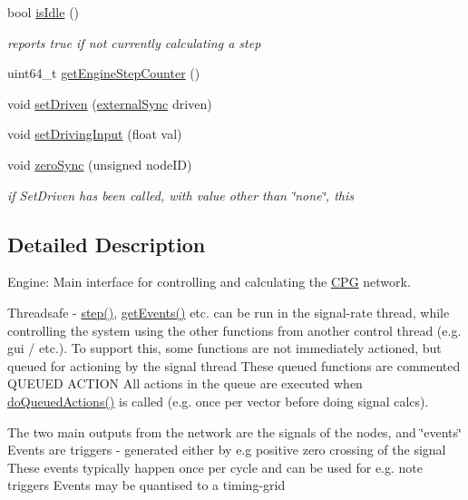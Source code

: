 \begin{DoxyCompactItemize}
bool \mbox{\hyperlink{classMatsuokaEngine_a1b6e6f86762e4541854b4262eb217f7e}{is\+Idle}} ()
\begin{DoxyCompactList}\small\item\em reports true if not currently calculating a step \end{DoxyCompactList}\item 
uint64\+\_\+t \mbox{\hyperlink{classMatsuokaEngine_a40114e7866da03ae1b7f37bcbde09876}{get\+Engine\+Step\+Counter}} ()
\item 
void \mbox{\hyperlink{classMatsuokaEngine_a738106afa4c313de36150a9687700193}{set\+Driven}} (\mbox{\hyperlink{classMatsuokaEngine_ad8f471b2f1ca479174d5514b9a3597ec}{external\+Sync}} driven)
\item 
void \mbox{\hyperlink{classMatsuokaEngine_a08b0d367297310a788461e3610e80623}{set\+Driving\+Input}} (float val)
\item 
void \mbox{\hyperlink{classMatsuokaEngine_a9ecbc93a17a602d8358c189363397575}{zero\+Sync}} (unsigned node\+ID)
\begin{DoxyCompactList}\small\item\em if Set\+Driven has been called, with value other than \char`\"{}none\char`\"{}, this \end{DoxyCompactList}\end{DoxyCompactItemize}


\subsection{Detailed Description}
Engine\+: Main interface for controlling and calculating the \mbox{\hyperlink{classCPG}{C\+PG}} network. 

Threadsafe -\/ \mbox{\hyperlink{classMatsuokaEngine_a4fa468dc0814f1ad92594f7a4d5abd00}{step()}}, \mbox{\hyperlink{classMatsuokaEngine_a70444163eee59d0df5b282bb8696f5a1}{get\+Events()}} etc. can be run in the signal-\/rate thread, while controlling the system using the other functions from another control thread (e.\+g. gui / etc.). To support this, some functions are not immediately actioned, but queued for actioning by the signal thread These queued functions are commented Q\+U\+E\+U\+ED A\+C\+T\+I\+ON All actions in the queue are executed when \mbox{\hyperlink{classMatsuokaEngine_affd6ef89f68c1aa654229a07e0160f2e}{do\+Queued\+Actions()}} is called (e.\+g. once per vector before doing signal calcs).

The two main outputs from the network are the signals of the nodes, and \char`\"{}events\char`\"{} Events are triggers -\/ generated either by e.\+g positive zero crossing of the signal These events typically happen once per cycle and can be used for e.\+g. note triggers Events may be quantised to a timing-\/grid 

